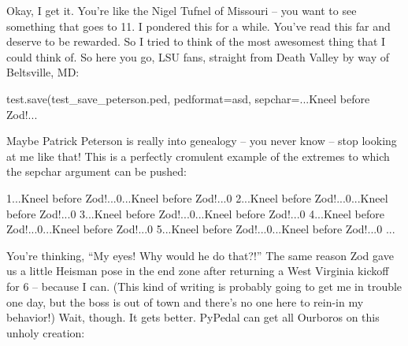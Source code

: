 \documentclass[
  letterpaper,
  DIV=11,
  numbers=noendperiod]{scrreprt}
\newenvironment{Shaded}{\begin{snugshade}}{\end{snugshade}}
\newcommand{\FloatTok}[1]{\textcolor[rgb]{0.68,0.00,0.00}{#1}}
\newcommand{\NormalTok}[1]{\textcolor[rgb]{0.00,0.23,0.31}{#1}}
\newcommand{\OperatorTok}[1]{\textcolor[rgb]{0.37,0.37,0.37}{#1}}
\newcommand{\StringTok}[1]{\textcolor[rgb]{0.13,0.47,0.30}{#1}}
\begin{document}
Okay, I get it. You're like the Nigel Tufnel of Missouri -- you want to
see something that goes to 11. I pondered this for a while. You've read
this far and deserve to be rewarded. So I tried to think of the most
awesomest thing that I could think of. So here you go, LSU fans,
straight from Death Valley by way of Beltsville, MD:

\begin{Shaded}
\begin{Highlighting}[]
\NormalTok{test.save(}\StringTok{\textquotesingle{}test\_save\_peterson.ped\textquotesingle{}}\NormalTok{, pedformat}\OperatorTok{=}\StringTok{\textquotesingle{}asd\textquotesingle{}}\NormalTok{, sepchar}\OperatorTok{=}\StringTok{\textquotesingle{}...Kneel before Zod!...\textquotesingle{}}
\end{Highlighting}
\end{Shaded}

Maybe Patrick Peterson is really into genealogy -- you never know --
stop looking at me like that! This is a perfectly cromulent example of
the extremes to which the sepchar argument can be pushed:

\begin{Shaded}
\begin{Highlighting}[]
\FloatTok{1.}\NormalTok{..Kneel before Zod}\OperatorTok{!}\NormalTok{..}\FloatTok{.0}\NormalTok{...Kneel before Zod}\OperatorTok{!}\NormalTok{..}\FloatTok{.0}
\FloatTok{2.}\NormalTok{..Kneel before Zod}\OperatorTok{!}\NormalTok{..}\FloatTok{.0}\NormalTok{...Kneel before Zod}\OperatorTok{!}\NormalTok{..}\FloatTok{.0}
\FloatTok{3.}\NormalTok{..Kneel before Zod}\OperatorTok{!}\NormalTok{..}\FloatTok{.0}\NormalTok{...Kneel before Zod}\OperatorTok{!}\NormalTok{..}\FloatTok{.0}
\FloatTok{4.}\NormalTok{..Kneel before Zod}\OperatorTok{!}\NormalTok{..}\FloatTok{.0}\NormalTok{...Kneel before Zod}\OperatorTok{!}\NormalTok{..}\FloatTok{.0}
\FloatTok{5.}\NormalTok{..Kneel before Zod}\OperatorTok{!}\NormalTok{..}\FloatTok{.0}\NormalTok{...Kneel before Zod}\OperatorTok{!}\NormalTok{..}\FloatTok{.0}
\NormalTok{...}
\end{Highlighting}
\end{Shaded}

You're thinking, ``My eyes! Why would he do that?!'' The same reason Zod
gave us a little Heisman pose in the end zone after returning a West
Virginia kickoff for 6 -- because I can. (This kind of writing is
probably going to get me in trouble one day, but the boss is out of town
and there's no one here to rein-in my behavior!) Wait, though. It gets
better. PyPedal can get all Ourboros on this unholy creation:
\end{document}
